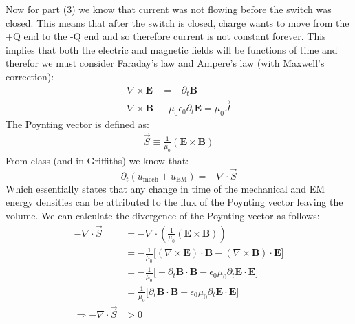 \documentclass[a4paper, 11pt]{article}
\begin{document}
\noindent Now for part (3) we know that current was not flowing before the switch was closed. This means that after the switch is closed, charge wants to move from the +Q end to the -Q end and so therefore current is not constant forever. This implies that both the electric and magnetic fields will be functions of time and therefor we must consider Faraday's law and Ampere's law (with Maxwell's correction): 
	\begin{align*}
		\nabla \times \mathbf{E} &= -\partial_t \mathbf{B} \\ 
		\nabla \times \mathbf{B} &- \mu_0\epsilon_0\partial_t\mathbf{E} = \mu_0 \vec{J} 
	\end{align*}
The Poynting vector is defined as: 	
	\begin{align*}
		\vec{S} \equiv \frac{1}{\mu_0}(\mathbf{E} \times \mathbf{B})
	\end{align*}
From class (and in Griffiths) we know that: 
	\begin{equation*}
		\partial_t(u_{\text{mech}}+u_{\text{EM}}) = -\nabla \cdot \vec{S}
	\end{equation*}
Which essentially states that any change in time of the mechanical and EM energy densities can be attributed to the flux of the Poynting vector leaving the volume. We can calculate 
the divergence of the Poynting vector as follows: 
	\begin{align*}
		-\nabla \cdot \vec{S} &= -\nabla \cdot (\frac{1}{\mu_0}(\mathbf{E} \times\mathbf{B})) \\ 
				&= -\frac{1}{\mu_0}\Big[(\nabla \times \mathbf{E})\cdot \mathbf{B} - (\nabla \times \mathbf{B})\cdot \mathbf{E}\Big] \\ 
				&= -\frac{1}{\mu_0}\Big[-\partial_t\mathbf{B}\cdot \mathbf{B} - \epsilon_0\mu_0\partial_t\mathbf{E}\cdot\mathbf{E}\Big]  \\ 	
				&= \frac{1}{\mu_0}\Big[\partial_t\mathbf{B}\cdot \mathbf{B} + \epsilon_0\mu_0\partial_t\mathbf{E}\cdot\mathbf{E}\Big]\\
		\Rightarrow -\nabla \cdot \vec{S} &> 0 				
	\end{align*}
\end{document}
